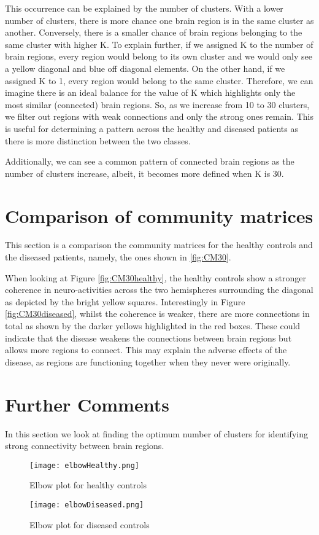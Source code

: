This occurrence can be explained by the number of clusters. With a lower number of clusters, there is more chance one brain region is in the same cluster as another. Conversely, there is a smaller chance of brain regions belonging to the same cluster with higher K. To explain further, if we assigned K to the number of brain regions, every region would belong to its own cluster and we would only see a yellow diagonal and blue off diagonal elements. On the other hand, if we assigned K to 1, every region would belong to the same cluster. Therefore, we can imagine there is an ideal balance for the value of K which highlights only the most similar (connected) brain regions. So, as we increase from 10 to 30 clusters, we filter out regions with weak connections and only the strong ones remain. This is useful for determining a pattern across the healthy and diseased patients as there is more distinction between the two classes.

Additionally, we can see a common pattern of connected brain regions as the number of clusters increase, albeit, it becomes more defined when K is 30.

\section{Comparison of community matrices}
This section is a comparison the community matrices for the healthy controls and the diseased patients, namely, the ones shown in \ref{fig:CM30}.

When looking at Figure \ref{fig:CM30healthy}, the healthy controls show a stronger coherence in neuro-activities across the two hemispheres surrounding the diagonal as depicted by the bright yellow squares. Interestingly in Figure \ref{fig:CM30diseased}, whilst the coherence is weaker, there are more connections in total as shown by the darker yellows highlighted in the red boxes. These could indicate that the disease weakens the connections between brain regions but allows more regions to connect. This may explain the adverse effects of the disease, as regions are functioning together when they never were originally.

\section{Further Comments}

In this section we look at finding the optimum number of clusters for identifying strong connectivity between brain regions.

\begin{figure}[h!] 
	\centering
	\texttt{[image: elbowHealthy.png]}
	\caption{Elbow plot for healthy controls}
	\label{fig:ElbowHealthy}
\end{figure}

\begin{figure}[h!] 
	\centering
	\texttt{[image: elbowDiseased.png]}
	\caption{Elbow plot for diseased controls}
	\label{fig:ElbowDiseased}
\end{figure}











